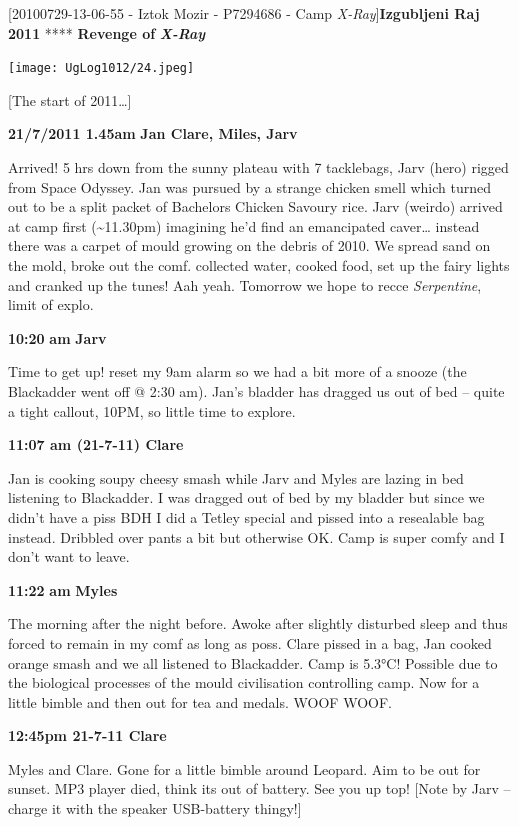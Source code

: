 {[}20100729-13-06-55 - Iztok Mozir - P7294686 - Camp
\emph{X-Ray}{]}\textbf{Izgubljeni Raj 2011} **** \textbf{Revenge of}
\textbf{\emph{X-Ray}}

\texttt{[image: UgLog1012/24.jpeg]}

{[}The start of 2011\ldots{}{]}

\textbf{21/7/2011 1.45am} \textbf{Jan Clare, Miles, Jarv}

Arrived! 5 hrs down from the sunny plateau with 7 tacklebags, Jarv
(hero) rigged from Space Odyssey. Jan was pursued by a strange chicken
smell which turned out to be a split packet of Bachelors Chicken Savoury
rice. Jarv (weirdo) arrived at camp first (\textasciitilde{}11.30pm)
imagining he'd find an emancipated caver\ldots{} instead there was a
carpet of mould growing on the debris of 2010. We spread sand on the
mold, broke out the comf. collected water, cooked food, set up the fairy
lights and cranked up the tunes! Aah yeah. Tomorrow we hope to recce
\emph{Serpentine}, limit of explo.

\textbf{10:20} \textbf{am} \textbf{Jarv}

Time to get up! reset my 9am alarm so we had a bit more of a snooze (the
Blackadder went off @ 2:30 am). Jan's bladder has dragged us out of bed
-- quite a tight callout, 10PM, so little time to explore.

\textbf{11:07 am (21-7-11) Clare}

Jan is cooking soupy cheesy smash while Jarv and Myles are lazing in bed
listening to Blackadder. I was dragged out of bed by my bladder but
since we didn't have a piss BDH I did a Tetley special and pissed into a
resealable bag instead. Dribbled over pants a bit but otherwise OK. Camp
is super comfy and I don't want to leave.

\textbf{11:22} \textbf{am} \textbf{Myles}

The morning after the night before. Awoke after slightly disturbed sleep
and thus forced to remain in my comf as long as poss. Clare pissed in a
bag, Jan cooked orange smash and we all listened to Blackadder. Camp is
5.3°C! Possible due to the biological processes of the mould
civilisation controlling camp. Now for a little bimble and then out for
tea and medals. WOOF WOOF.

\textbf{12:45pm 21-7-11 Clare}

Myles and Clare. Gone for a little bimble around Leopard. Aim to be out
for sunset. MP3 player died, think its out of battery. See you up top!
{[}Note by Jarv -- charge it with the speaker USB-battery thingy!{]}

